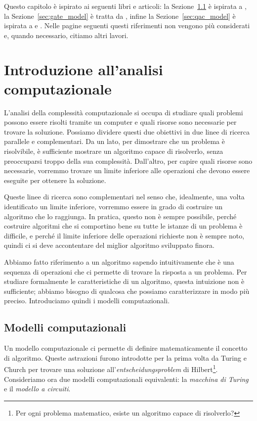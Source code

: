 Questo capitolo è ispirato ai seguenti libri e articoli: la Sezione~\ref{sec:complexity} è ispirata a \cite[capitoli $3$ e $4$]{nielsen2010quantum}, la Sezione~\ref{sec:gate_model} è tratta da \cite[capitoli $2$, $3$, $4$ e $7$]{nielsen2010quantum}, infine la Sezione~\ref{sec:qac_model} è ispirata a \cite[capitoli $2$ e $3$]{mcgeoch2022adiabatic} e \cite{k2005transverse}. Nelle pagine seguenti questi riferimenti non vengono più considerati e, quando necessario, citiamo altri lavori.

\section{Introduzione all'analisi computazionale}
L'analisi della complessità computazionale si occupa di studiare quali problemi possono essere risolti tramite un computer e quali risorse sono necessarie per trovare la soluzione. Possiamo dividere questi due obiettivi in due linee di ricerca parallele e complementari. Da un lato, per dimostrare che un problema è risolvibile, è sufficiente mostrare un algoritmo capace di risolverlo, senza preoccuparsi troppo della sua complessità. Dall'altro, per capire quali risorse sono necessarie, vorremmo trovare un limite inferiore alle operazioni che devono essere eseguite per ottenere la soluzione.

Queste linee di ricerca sono complementari nel senso che, idealmente, una volta identificato un limite inferiore, vorremmo essere in grado di costruire un algoritmo che lo raggiunga. In pratica, questo non è sempre possibile, perché costruire algoritmi che si comportino bene su tutte le istanze di un problema è difficile, e perché il limite inferiore delle operazioni richieste non è sempre noto, quindi ci si deve accontentare del miglior algoritmo sviluppato finora.

Abbiamo fatto riferimento a un algoritmo sapendo intuitivamente che è una sequenza di operazioni che ci permette di trovare la risposta a un problema. Per studiare formalmente le caratteristiche di un algoritmo, questa intuizione non è sufficiente; abbiamo bisogno di qualcosa che possiamo caratterizzare in modo più preciso. Introduciamo quindi i modelli computazionali.
\subsection{Modelli computazionali}
\label{sec:complexity}
Un modello computazionale ci permette di definire matematicamente il concetto di algoritmo. Queste astrazioni furono introdotte per la prima volta da Turing e Church per trovare una soluzione all'\emph{entscheidungsproblem} di Hilbert\footnote{Per ogni problema matematico, esiste un algoritmo capace di risolverlo?}. Consideriamo ora due modelli computazionali equivalenti: la \emph{macchina di Turing} e il \emph{modello a circuiti}. 
